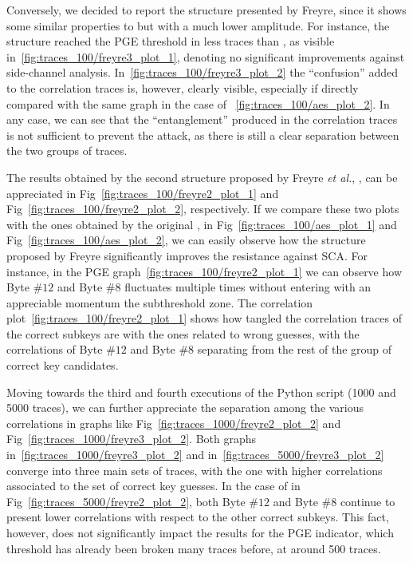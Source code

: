         Conversely, we decided to report the \xfthree{} structure presented by Freyre, since it shows some similar properties to \xftwo{} but with a much lower amplitude. For instance, the structure reached the PGE threshold in less traces than \aes{} \sbocs{}, as visible in~\ref{fig:traces_100/freyre3_plot_1}, denoting no significant improvements against side-channel analysis. In~\ref{fig:traces_100/freyre3_plot_2} the ``confusion'' added to the correlation traces is, however, clearly visible, especially if directly compared with the same graph in the case of \aes{}~\ref{fig:traces_100/aes_plot_2}. In any case, we can see that the ``entanglement'' produced in the correlation traces is not sufficient to prevent the attack, as there is still a clear separation between the two groups of traces.

        The results obtained by the second \sbocs{} structure proposed by Freyre \emph{et al.}, \xftwo{}, can be appreciated in Fig~\ref{fig:traces_100/freyre2_plot_1} and Fig~\ref{fig:traces_100/freyre2_plot_2}, respectively. If we compare these two plots with the ones obtained by the original \aes{} \sbocs{}, in Fig~\ref{fig:traces_100/aes_plot_1} and Fig~\ref{fig:traces_100/aes_plot_2}, we can easily observe how the structure proposed by Freyre significantly improves the resistance against SCA. For instance, in the PGE graph~\ref{fig:traces_100/freyre2_plot_1} we can observe how Byte $\#12$ and Byte $\#8$ fluctuates multiple times without entering with an appreciable momentum the subthreshold zone. The correlation plot~\ref{fig:traces_100/freyre2_plot_1} shows how tangled the correlation traces of the correct subkeys are with the ones related to wrong guesses, with the correlations of Byte $\#12$ and Byte $\#8$ separating from the rest of the group of correct key candidates.

        Moving towards the third and fourth executions of the Python script (1000 and 5000 traces), we can further appreciate the separation among the various correlations in graphs like Fig~\ref{fig:traces_1000/freyre2_plot_2} and Fig~\ref{fig:traces_1000/freyre3_plot_2}. Both graphs in~\ref{fig:traces_1000/freyre3_plot_2} and in~\ref{fig:traces_5000/freyre3_plot_2} converge into three main sets of traces, with the one with higher correlations associated to the set of correct key guesses.
        In the case of \xftwo in Fig~\ref{fig:traces_5000/freyre2_plot_2}, both Byte $\#12$ and Byte $\#8$ continue to present lower correlations with respect to the other correct subkeys. This fact, however, does not significantly impact the results for the PGE indicator, which threshold has already been broken many traces before, at around 500 traces.
        
